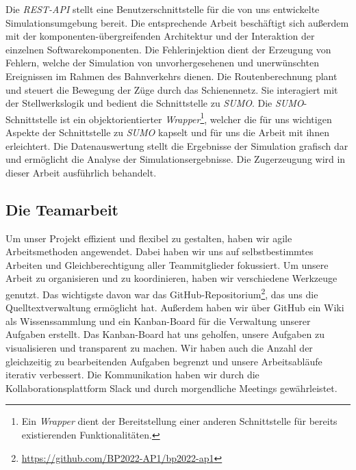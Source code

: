 Die \emph{REST-API} stellt eine Benutzerschnittstelle für die von uns entwickelte Simulationsumgebung bereit. Die entsprechende Arbeit beschäftigt sich außerdem mit der komponenten-übergreifenden Architektur und der Interaktion der einzelnen Softwarekomponenten. Die Fehlerinjektion dient der Erzeugung von Fehlern, welche der Simulation von unvorhergesehenen und unerwünschten Ereignissen im Rahmen des Bahnverkehrs dienen. Die Routenberechnung plant und steuert die Bewegung der Züge durch das Schienennetz. Sie interagiert mit der Stellwerkslogik und bedient die Schnittstelle zu \emph{SUMO}. Die \emph{SUMO}-Schnittstelle ist ein objektorientierter \emph{Wrapper}\footnote{Ein \emph{Wrapper} dient der Bereitstellung einer anderen Schnittstelle für bereits existierenden Funktionalitäten.}, welcher die für uns wichtigen Aspekte der Schnittstelle zu \emph{SUMO} kapselt und für uns die Arbeit mit ihnen erleichtert. Die Datenauswertung stellt die Ergebnisse der Simulation grafisch dar und ermöglicht die Analyse der Simulationsergebnisse. Die Zugerzeugung wird in dieser Arbeit ausführlich behandelt.

\subsection{Die Teamarbeit}

Um unser Projekt effizient und flexibel zu gestalten, haben wir agile Arbeitsmethoden angewendet. Dabei haben wir uns auf selbstbestimmtes Arbeiten und Gleichberechtigung aller Teammitglieder fokussiert. Um unsere Arbeit zu organisieren und zu koordinieren, haben wir verschiedene Werkzeuge genutzt. Das wichtigste davon war das GitHub-Repositorium\footnote{\url{https://github.com/BP2022-AP1/bp2022-ap1}}, das uns die Quelltextverwaltung ermöglicht hat. Außerdem haben wir über GitHub ein Wiki als Wissenssammlung und ein Kanban-Board für die Verwaltung unserer Aufgaben erstellt. Das Kanban-Board hat uns geholfen, unsere Aufgaben zu visualisieren und transparent zu machen. Wir haben auch die Anzahl der gleichzeitig zu bearbeitenden Aufgaben begrenzt und unsere Arbeitsabläufe iterativ verbessert. Die Kommunikation haben wir durch die Kollaborationsplattform Slack und durch morgendliche Meetings gewährleistet.